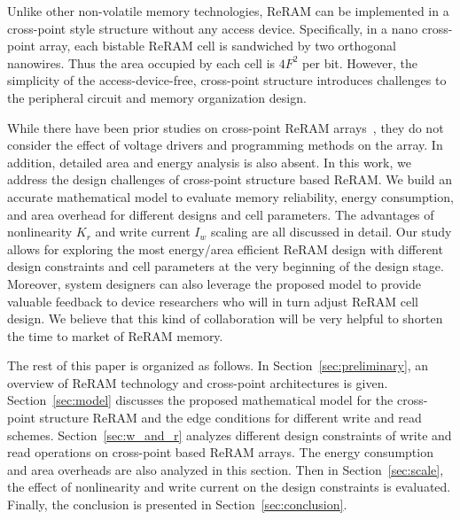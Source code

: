 Unlike other non-volatile memory technologies, ReRAM can be implemented in
a cross-point style structure without any access device. Specifically, in
a nano cross-point array, each bistable ReRAM cell is sandwiched by two
orthogonal nanowires. Thus the area occupied by each cell is $4F^2$ per
bit. However, the simplicity of the access-device-free, cross-point
structure introduces challenges to the peripheral circuit and memory
organization design.

While there have been prior studies on cross-point ReRAM
arrays~\cite{crossbar_NANO2002_Ziegler,crossbar_NANO08_Flocke,crossbar_TED_2010,crossbar_NANO2003_Ziegler},
they do not consider the effect of voltage drivers and programming methods
on the array. In addition, detailed area and energy analysis is also
absent. In this work, we address the design challenges of cross-point
structure based ReRAM. We build an accurate mathematical model to evaluate
memory reliability, energy consumption, and area overhead for different
designs and cell parameters. The advantages of nonlinearity $K_r$ and
write current $I_w$ scaling are all discussed in detail. Our study allows
for exploring the most energy/area efficient ReRAM design with different
design constraints and cell parameters at the very beginning of the design
stage. Moreover, system designers can also leverage the proposed
model to provide valuable feedback to device researchers who will in turn
adjust ReRAM cell design. We believe that this kind of collaboration will
be very helpful to shorten the time to market of ReRAM memory.

The rest of this paper is organized as follows. In
Section~\ref{sec:preliminary}, an overview of ReRAM technology and
cross-point architectures is given. Section~\ref{sec:model} %
discusses the proposed mathematical model for the cross-point structure
ReRAM and the edge conditions for different write and read schemes.
Section~\ref{sec:w_and_r} analyzes different design constraints of write
and read operations on cross-point based ReRAM arrays. The energy
consumption and area overheads are also analyzed in this section. Then in
Section~\ref{sec:scale}, the effect of nonlinearity and write current on
the design constraints is evaluated. Finally, the conclusion is presented
in Section~\ref{sec:conclusion}.
